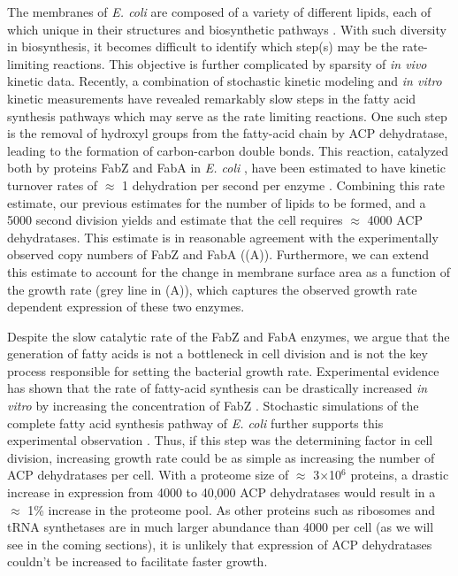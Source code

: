The membranes of \textit{E. coli} are composed of a variety of different
lipids, each of which unique in their structures and biosynthetic pathways
\citep{sohlenkamp2016}. With such diversity in biosynthesis, it becomes
difficult to identify which step(s) may be the rate-limiting reactions. This
objective is further complicated by sparsity of \textit{in vivo} kinetic
data. Recently, a combination of stochastic kinetic modeling
\citep{ruppe2018} and \textit{in vitro} kinetic measurements
\citep{ranganathan2012, yu2011} have revealed remarkably slow steps in the
fatty acid synthesis pathways which may serve as the rate limiting reactions.
One such step is the removal of hydroxyl groups from the fatty-acid chain by
ACP dehydratase, leading to the formation of carbon-carbon double bonds. This
reaction, catalyzed both by proteins FabZ and FabA in \textit{E. coli}
\citep{yu2011}, have been estimated to have kinetic turnover rates of
$\approx$ 1 dehydration per second per enzyme \citep{ruppe2018}. Combining
this rate estimate, our previous estimates for the number of lipids to be
formed, and a 5000 second division yields and estimate that the cell requires
$\approx$ 4000 ACP dehydratases. This estimate is in reasonable agreement with the experimentally observed copy
numbers of FabZ and FabA ((A)). Furthermore, we can extend
this estimate to account for the change in membrane surface area as a function
of the growth rate (grey line in (A)), which captures the
observed growth rate dependent expression of these two enzymes. 

Despite the slow catalytic rate of the FabZ and FabA enzymes, we argue that the
generation of fatty acids is not a bottleneck in cell division and is not the
key process responsible for setting the bacterial growth rate. Experimental
evidence has shown that the rate of fatty-acid synthesis can be drastically
increased \textit{in vitro} by increasing the concentration of FabZ
\cite{yu2011}. Stochastic simulations of the complete fatty acid synthesis
pathway of \textit{E. coli} further supports this experimental observation
\cite{ruppe2018}. Thus, if this step was the determining factor in cell
division, increasing growth rate could be as simple as increasing the number of
ACP dehydratases per cell. With a proteome size of $\approx$ 3$\times$10$^6$
proteins, a drastic increase in expression from 4000 to 40,000 ACP dehydratases
would result in a $\approx$ 1\% increase in the proteome pool. As other proteins
such as ribosomes and tRNA synthetases are in much larger
abundance than 4000 per cell (as we will see in the coming sections), it is
unlikely that expression of ACP dehydratases couldn't be increased to facilitate
faster growth.


